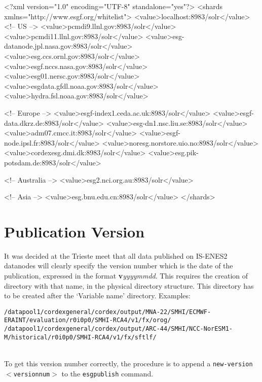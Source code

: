 \begin{tiny}
\begin{verbatimtab}[4]
<?xml version="1.0" encoding="UTF-8" standalone="yes"?>
<shards xmlns="http://www.esgf.org/whitelist">
    <value>localhost:8983/solr</value>
    <!-- US -->
    <value>pcmdi9.llnl.gov:8983/solr</value>
    <value>pcmdi11.llnl.gov:8983/solr</value>
    <value>esg-datanode.jpl.nasa.gov:8983/solr</value>
    <value>esg.ccs.ornl.gov:8983/solr</value>
    <value>esgf.nccs.nasa.gov:8983/solr</value>
    <value>esg01.nersc.gov:8983/solr</value>
    <value>esgdata.gfdl.noaa.gov:8983/solr</value>
    <value>hydra.fsl.noaa.gov:8983/solr</value>
    
    <!-- Europe -->
    <value>esgf-index1.ceda.ac.uk:8983/solr</value>
    <value>esgf-data.dkrz.de:8983/solr</value>
    <value>esg-dn1.nsc.liu.se:8983/solr</value>
    <value>adm07.cmcc.it:8983/solr</value>
    <value>esgf-node.ipsl.fr:8983/solr</value>
    <value>noresg.norstore.uio.no:8983/solr</value>
    <value>cordexesg.dmi.dk:8983/solr</value>
    <value>esg.pik-potsdam.de:8983/solr</value>
  
    <!-- Australia -->
    <value>esg2.nci.org.au:8983/solr</value>
 
    <!-- Asia -->
   <value>esg.bnu.edu.cn:8983/solr</value>
</shards>

\end{verbatimtab}
\end{tiny}

\section{Publication Version}
It was decided at the Trieste meet that all data published on IS-ENES2 datanodes will clearly specify the version number which is the date of the publication, expressed in the format \textbf{v}\textit{yyyymmdd}. This requires the creation of directory with that name, in the physical directory structure. This directory has to be created after the `Variable name' directory. Examples:\\
\begin{tiny}
\texttt{/datapool1/cordexgeneral/cordex/output/MNA-22/SMHI/ECMWF-ERAINT/evaluation/r0i0p0/SMHI-RCA4/v1/fx/orog/}\\
\texttt{/datapool1/cordexgeneral/cordex/output/ARC-44/SMHI/NCC-NorESM1-M/historical/r0i0p0/SMHI-RCA4/v1/fx/sftlf/}\\
\end{tiny}
\\To get this version number correctly, the procedure is to append a \texttt{\myopt new-version $<$versionnum$>$} to the \texttt{esgpublish} command.

